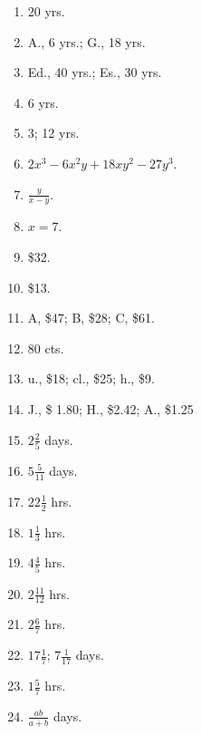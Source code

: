 \documentclass{book}
\begin{document}
\begin{enumerate}
\item  20 yrs.

\item  A., 6 yrs.; G., 18 yrs.

\item  Ed., 40 yrs.; Es., 30 yrs.

\item  6 yrs.

\item  3; 12 yrs.

\item  $2 x^3 - 6 x^2y + 18xy^2 - 27 y^3$.

\setcounter{enumi}{32}

\item  $\displaystyle \frac{y}{x - y}$.

\item  $x = 7$.

\item  \$32.

\item  \$13.

\item  A, \$47; B, \$28; C, \$61.

\item  80 cts.

\item u., \$18; cl., \$25; h., \$9.

\item J., \$ 1.80; H., \$2.42; A., \$1.25

\item  $2\frac{2}{5}$ days.

\item  $5\frac{5}{11}$ days.

\item  $22\frac{1}{2}$ hrs.

\item  $1\frac{1}{3}$ hrs.

\item  $4\frac{4}{5}$ hrs.

\item  $2\frac{11}{12}$ hrs.

\item  $2\frac{6}{7}$ hrs.

\item  $17\frac{1}{7}$; $7\frac{1}{17}$ days.

\item  $1\frac{5}{7}$ hrs.

\item  $\displaystyle \frac{ab}{a + b}$ days.


\end{enumerate}
\end{document}
